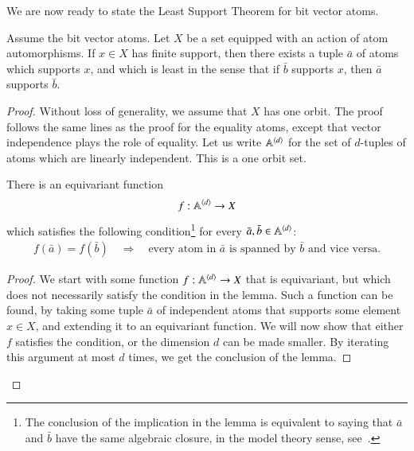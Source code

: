We are now ready to state the Least Support Theorem for bit vector atoms. 


\begin{theorem}\label{thm:least-support-bit} Assume the bit vector atoms. Let $X$ be a set equipped with an action of atom automorphisms. If $x \in X$ has finite support, then there exists a tuple $\bar a$ of atoms which supports $x$, and which is least in the sense that if $\bar b$ supports $x$, then $\bar a$ supports $\bar b$. 
\end{theorem}

\begin{proof}
	Without loss of generality, we assume that $X$ has one orbit.
		The proof follows the same lines as the proof for the equality atoms,  except that vector independence plays the role of equality. Let us write $\mathbb A^{\langle d \rangle}$ for the set of $d$-tuples of  atoms which are linearly independent. This is a one orbit set. 
	
\begin{lemma}
	There is an equivariant function 
	\begin{align*}
		f : \mathbb A^{\langle d \rangle} \to X
	   \end{align*}
	   which satisfies the following condition\footnote{The conclusion of the implication in the lemma is equivalent to saying that $\bar a$ and $\bar b$ have the same algebraic closure, in the model theory sense, see~\cite[Chapter 4]{hodges1993model}.} for every $\bar a, \bar b \in \mathbb A^{\langle d \rangle}$: 
	   \begin{align*}
	   f(\bar a) = f(\bar b) 
	   \quad \Rightarrow \quad 
	   \text{every atom in $\bar a$ is spanned by $\bar b$ and vice versa.}
	   \end{align*}
\end{lemma}
\begin{proof}
	We start with some function $f : \mathbb A^{\langle d \rangle} \to X$ that is equivariant, but which does not necessarily satisfy the condition in the lemma. Such a function can be found, by taking some tuple $\bar a$ of independent atoms that supports some element $x \in X$, and extending it to an equivariant function. We will now show that  either $f$ satisfies  the condition, or  the dimension $d$ can be made smaller. By iterating this argument at most $d$ times, we get the conclusion of the lemma.
	 

\end{proof}
\end{proof}
